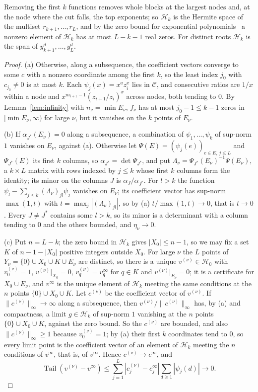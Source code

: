 \documentclass[11pt]{article}
\theoremstyle{definition}
\theoremstyle{plain}
\DeclareMathOperator{\Tail}{Tail}
\begin{document}
Removing the first $k$ functions removes whole blocks at the largest nodes
and, at the node where the cut falls, the top exponents; so $\mathcal H_k$ is
the Hermite space of the multiset $r_{k+1},\ldots,r_L$, and by the zero bound
for exponential polynomials~\cite[Part~Five, Ch.~1]{polya-szego} a nonzero
element of $\mathcal H_k$ has at most $L-k-1$ real zeros.  For distinct roots
$\mathcal H_k$ is the span of
$y_{k+1}^d,\ldots,y_L^d$.

\begin{proof}
(a) Otherwise, along a subsequence, the coefficient vectors converge to some
$c$ with a nonzero coordinate among the first $k$, so the least index $j_0$
with $c_{j_0}\ne0$ is at most $k$.  Each $\psi_j(x)=x^az_i^x$ lies in
$\mathcal C$, and consecutive ratios are $1/x$ within a node and
$x^{m_{i+1}-1}(z_{i+1}/z_i)^x$ across nodes, both tending to $0$.  By
Lemma~\ref{lem:infinity} with $n_\nu=\min E_\nu$, $f_\nu$ has at most
$j_0-1\le k-1$ zeros in $[\min E_\nu,\infty)$ for large $\nu$, but it vanishes
on the $k$ points of $E_\nu$.

(b) If $\alpha_{J^*}(E_\nu)=0$ along a subsequence, a combination of
$\psi_1,\ldots,\psi_k$ of sup-norm $1$ vanishes on $E_\nu$, against (a).
Otherwise let $\Psi(E)=(\psi_j(e))_{e\in E,\,j\le L}$ and $\Psi_{J^*}(E)$ its
first $k$ columns, so $\alpha_{J^*}=\det\Psi_{J^*}$, and put
$\Lambda_\nu=\Psi_{J^*}(E_\nu)^{-1}\Psi(E_\nu)$, a $k\times L$ matrix with rows
indexed by $j\le k$ whose first $k$ columns form the identity; its minor on
the columns $J$ is $\alpha_J/\alpha_{J^*}$.  For
$l>k$ the function $\psi_l-\sum_{j\le k}(\Lambda_\nu)_{jl}\psi_j$ vanishes on
$E_\nu$; its coefficient vector has sup-norm $\max(1,t)$ with
$t=\max_j|(\Lambda_\nu)_{jl}|$, so by (a) $t/\max(1,t)\to0$, that is $t\to0$.
Every $J\ne J^*$ contains some $l>k$, so its minor is a determinant with a
column tending to $0$ and the others bounded, and $\eta_\nu\to0$.

(c) Put $n=L-k$; the zero bound in $\mathcal H_k$ gives $|X_0|\le n-1$, so
we may fix a set $K$ of $n-1-|X_0|$ positive integers outside $X_0$.  For
large $\nu$ the $L$ points of $Y_\nu=\{0\}\cup X_0\cup K\cup E_\nu$ are
distinct, so there is a unique $v^{(\nu)}\in\mathcal H_0$ with
$v^{(\nu)}_0=1$, $v^{(\nu)}|_{X_0}=0$, $v^{(\nu)}_q=v^\infty_q$ for $q\in K$
and $v^{(\nu)}|_{E_\nu}=0$; it is a certificate for $X_0\cup E_\nu$, and
$v^\infty$ is the unique element of $\mathcal H_k$ meeting the same
conditions at the $n$ points $\{0\}\cup X_0\cup K$.  Let $c^{(\nu)}$ be the
coefficient vector of $v^{(\nu)}$.  If $\|c^{(\nu)}\|_\infty\to\infty$ along
a subsequence, then $v^{(\nu)}/\|c^{(\nu)}\|_\infty$ has, by (a) and
compactness, a limit $g\in\mathcal H_k$ of sup-norm $1$ vanishing at the $n$
points $\{0\}\cup X_0\cup K$, against the zero bound.  So the $c^{(\nu)}$ are
bounded, and also $\|c^{(\nu)}\|_\infty\ge1$ because $v^{(\nu)}_0=1$; by (a)
their first $k$ coordinates tend to $0$, so every limit point is the
coefficient vector of an element of $\mathcal H_k$ meeting the $n$ conditions
of $v^\infty$, that is, of $v^\infty$.  Hence $c^{(\nu)}\to c^\infty$, and
\[
  \Tail(v^{(\nu)}-v^\infty)\le\sum_{j=1}^L|c^{(\nu)}_j-c^\infty_j|
  \sum_{d\ge1}|\psi_j(d)|\longrightarrow0 .
\]
\end{proof}
\end{document}

